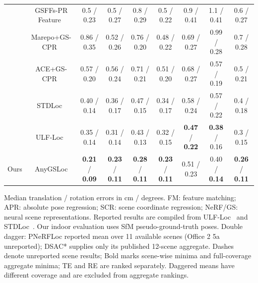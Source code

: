 \begin{table}[tp]
\begin{tabular}{lcccccccc}
 & GSFFs-PR Feature~\cite{reported260504730v1bibbib52} & 0.5 / 0.23 & 0.5 / 0.27 & 0.8 / 0.29 & 0.5 / 0.22 & 0.9 / 0.41 & 1.1 / 0.41 & 0.6 / 0.27 \\
 & Marepo+GS-CPR~\cite{reported260504730v1bibbib61} & 0.86 / 0.35 & 0.52 / 0.26 & 0.76 / 0.20 & 0.48 / 0.22 & 0.69 / 0.27 & 0.99 / 0.28 & 0.7 / 0.28 \\
 & ACE+GS-CPR~\cite{reported260504730v1bibbib61} & 0.57 / 0.20 & 0.56 / 0.24 & 0.71 / 0.21 & 0.51 / 0.20 & 0.68 / 0.27 & 0.57 / 0.19 & 0.5 / 0.21 \\
 & STDLoc~\cite{huang2025stdloc} & 0.40 / 0.14 & 0.36 / 0.17 & 0.47 / 0.15 & 0.34 / 0.17 & 0.58 / 0.24 & 0.57 / 0.22 & 0.4 / 0.18 \\
 & ULF-Loc~\cite{gu2026ulfloc} & 0.35 / 0.14 & 0.31 / 0.14 & 0.43 / 0.13 & 0.32 / 0.15 & \textbf{0.47} / \textbf{0.22} & \textbf{0.38} / 0.16 & 0.3 / 0.15 \\
\midrule
Ours & AnyGSLoc & \textbf{0.21} / \textbf{0.09} & \textbf{0.23} / \textbf{0.11} & \textbf{0.28} / \textbf{0.11} & \textbf{0.23} / \textbf{0.11} & 0.51 / 0.23 & 0.40 / \textbf{0.14} & \textbf{0.26} / \textbf{0.11} \\
\bottomrule
\end{tabular}
\par\smallskip\begin{minipage}{0.98\linewidth}\footnotesize Median translation / rotation errors in cm / degrees. FM: feature matching; APR: absolute pose regression; SCR: scene coordinate regression; NeRF/GS: neural scene representations. Reported results are compiled from ULF-Loc~\cite{gu2026ulfloc} and STDLoc~\cite{huang2025stdloc}. Our indoor evaluation uses SfM pseudo-ground-truth poses. Double dagger: PNeRFLoc reported mean over 11 available scenes (Office 2 5a unreported); DSAC* supplies only its published 12-scene aggregate. Dashes denote unreported scene results; Bold marks scene-wise minima and full-coverage aggregate minima; TE and RE are ranked separately. Daggered means have different coverage and are excluded from aggregate rankings.\end{minipage}
\end{table}

